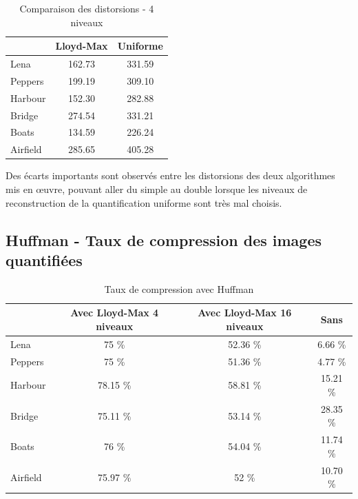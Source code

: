 \documentclass[a4paper, 12pt]{article}
\begin{document}
\begin{table}[!h]
	\centering
		\begin{tabular}{l|c|c|}
			\cline{2-3}
			                               & Lloyd-Max & Uniforme \\
			\hline
			\multicolumn{1}{|l|}{Lena}     & 162.73    &  331.59  \\
			\hline
			\multicolumn{1}{|l|}{Peppers}  & 199.19    &  309.10  \\
			\hline
			\multicolumn{1}{|l|}{Harbour}  & 152.30    &  282.88  \\
			\hline
			\multicolumn{1}{|l|}{Bridge}   & 274.54    &  331.21  \\
			\hline
			\multicolumn{1}{|l|}{Boats}    & 134.59    &  226.24  \\
			\hline
			\multicolumn{1}{|l|}{Airfield} & 285.65    &  405.28  \\
			\hline
		\end{tabular}
	\caption{Comparaison des distorsions - 4 niveaux}
	\label{tab:TableComparaisonDisto}
\end{table}

Des écarts importants sont observés entre les distorsions des deux algorithmes mis en œuvre, pouvant aller du simple au double lorsque les niveaux de reconstruction de la quantification uniforme sont très mal choisis.


\subsection{Huffman - Taux de compression des images quantifiées}

\begin{table}[!h]
	\centering
		\begin{tabular}{l|c | c| c|}
			\cline{2-4}
			                               & Avec Lloyd-Max 4 niveaux & Avec Lloyd-Max 16 niveaux & Sans      \\
			\hline
			\multicolumn{1}{|l|}{Lena}     & 75 \%                    & 52.36 \%                  & 6.66 \%   \\
			\hline
			\multicolumn{1}{|l|}{Peppers}  & 75 \%                    & 51.36 \%                  & 4.77 \%   \\
			\hline
			\multicolumn{1}{|l|}{Harbour}  & 78.15 \%                 & 58.81 \%                  & 15.21 \%  \\
			\hline
			\multicolumn{1}{|l|}{Bridge}   & 75.11 \%                 & 53.14 \%                  & 28.35 \%  \\
			\hline
			\multicolumn{1}{|l|}{Boats}    & 76 \%                    & 54.04 \%                  & 11.74 \%  \\
			\hline
			\multicolumn{1}{|l|}{Airfield} & 75.97 \%                 & 52 \%                     & 10.70 \%  \\
			\hline
		\end{tabular}
	\caption{Taux de compression avec Huffman}
	\label{tab:TableComparaisonTauxCompression}
\end{table}
\end{document}
